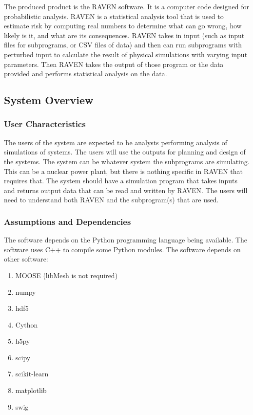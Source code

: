 \documentclass{article}
\begin{document}
The produced product is the RAVEN software.  It is a computer
code designed for probabilistic analysis.  RAVEN is a statistical
analysis tool that is used to estimate risk by computing real numbers
to determine what can go wrong, how likely is it, and what are its
consequences.  RAVEN takes in input (such as input files for
subprograms, or CSV files of data) and then can run subprograms with
perturbed input to calculate the result of physical simulations with
varying input parameters.  Then RAVEN takes the output of those
program or the data provided and performs statistical analysis on the
data.

\subsection{System Overview}

\subsubsection{User Characteristics}

The users of the system are expected to be analysts performing
analysis of simulations of systems.  The users will use the outputs
for planning and design of the systems.  The system can be whatever
system the subprograms are simulating.  This can be a nuclear power
plant, but there is nothing specific in RAVEN that requires that.  The
system should have a simulation program that takes inputs and returns
output data that can be read and written by RAVEN.  The users will
need to understand both RAVEN and the subprogram(s) that are used.

\subsubsection{Assumptions and Dependencies}

The software depends on the Python programming language being
available.  The software uses C++ to compile some Python modules.  The
software depends on other software:

\begin{enumerate}
\item MOOSE (libMesh is not required)
\item numpy
\item hdf5
\item Cython
\item h5py
\item scipy
\item scikit-learn
\item matplotlib
\item swig
\end{enumerate}
\end{document}
